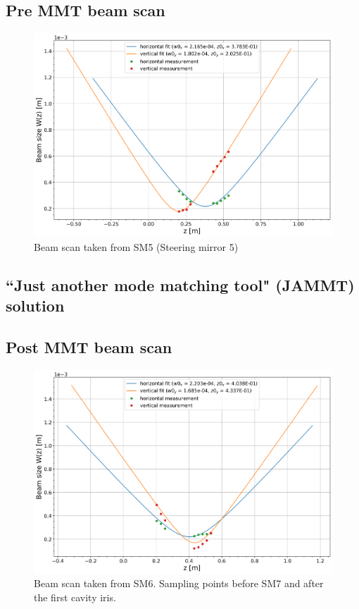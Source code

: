 \subsection{Pre MMT beam scan}

\begin{figure}[H]
\includegraphics[width=\textwidth]{figs/ALGAAS/beamscans/12_18_2020_preMMT.png}
\caption{Beam scan taken from SM5 (Steering mirror 5)}
\label{fig:macor_mount_design}
\end{figure}


\subsection{``Just another mode matching tool" (JAMMT) solution}


\subsection{Post MMT beam scan}

\begin{figure}[H]
\includegraphics[width=\textwidth]{figs/ALGAAS/beamscans/01_12_2021_postMMT.png}
\caption{Beam scan taken from SM6. Sampling points before SM7 and after the first cavity iris.}
\label{fig:macor_mount_design}
\end{figure}

